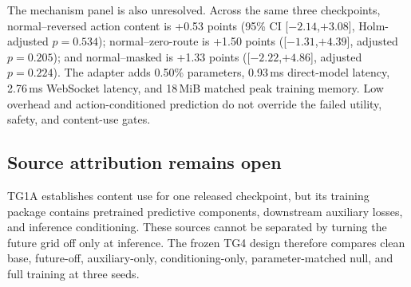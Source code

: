 The mechanism panel is also unresolved.  Across the same three checkpoints,
normal--reversed action content is +0.53 points (95\% CI
[$-2.14$,$+3.08$], Holm-adjusted $p=0.534$); normal--zero-route is +1.50
points ([$-1.31$,$+4.39$], adjusted $p=0.205$); and normal--masked is +1.33
points ([$-2.22$,$+4.86$], adjusted $p=0.224$).  The adapter adds 0.50\%
parameters, 0.93\,ms direct-model latency, 2.76\,ms WebSocket latency, and
18\,MiB matched peak training memory.  Low overhead and action-conditioned
prediction do not override the failed utility, safety, and content-use gates.

\subsection{Source attribution remains open}
TG1A establishes content use for one released checkpoint, but its training
package contains pretrained predictive components, downstream auxiliary
losses, and inference conditioning.  These sources cannot be separated by
turning the future grid off only at inference.  The frozen TG4 design therefore
compares clean base, future-off, auxiliary-only, conditioning-only,
parameter-matched null, and full training at three seeds.

